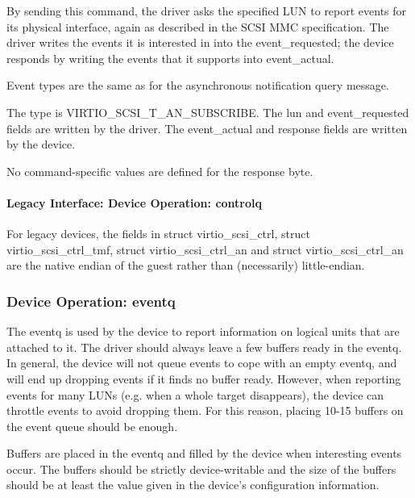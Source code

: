   By sending this command, the driver asks the specified LUN to
  report events for its physical interface, again as described in
  the SCSI MMC specification. The driver writes the events it is
  interested in into the event_requested; the device responds by
  writing the events that it supports into event_actual.

  Event types are the same as for the asynchronous notification
  query message.

  The type is VIRTIO_SCSI_T_AN_SUBSCRIBE. The lun and
  event_requested fields are written by the driver. The
  event_actual and response fields are written by the device.

  No command-specific values are defined for the response byte.

\paragraph{Legacy Interface: Device Operation: controlq}\label{sec:Device Types / SCSI Host Device / Device Operation / Device Operation: controlq / Legacy Interface: Device Operation: controlq}

For legacy devices, the fields in struct virtio_scsi_ctrl, struct
virtio_scsi_ctrl_tmf, struct virtio_scsi_ctrl_an and struct
virtio_scsi_ctrl_an are the native endian of the guest rather than
(necessarily) little-endian.


\subsubsection{Device Operation: eventq}\label{sec:Device Types / SCSI Host Device / Device Operation / Device Operation: eventq}

The eventq is used by the device to report information on logical
units that are attached to it. The driver should always leave a
few buffers ready in the eventq. In general, the device will not
queue events to cope with an empty eventq, and will end up
dropping events if it finds no buffer ready. However, when
reporting events for many LUNs (e.g. when a whole target
disappears), the device can throttle events to avoid dropping
them. For this reason, placing 10-15 buffers on the event queue
should be enough.

Buffers are placed in the eventq and filled by the device when
interesting events occur. The buffers should be strictly
device-writable and the size of the buffers should be
at least the value given in the device's configuration
information.

